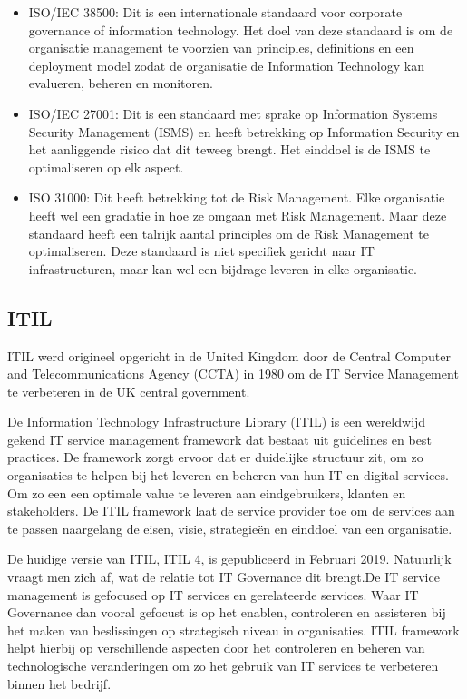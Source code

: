 \begin{itemize}
    \item ISO/IEC 38500:
    Dit is een internationale standaard voor corporate governance of information technology. Het doel van deze standaard is om de organisatie management te voorzien van principles, definitions en een deployment model zodat de organisatie de Information Technology kan evalueren, beheren en monitoren. \autocite{Mikkola2021}
    \item ISO/IEC 27001:
    Dit is een standaard met sprake op Information Systems Security Management (ISMS) en heeft betrekking op Information Security en het aanliggende risico dat dit teweeg brengt. Het einddoel is de ISMS te optimaliseren op elk aspect. \autocite{AlMayahi2012}
    \item ISO 31000:
    Dit heeft betrekking tot de Risk Management. Elke organisatie heeft wel een gradatie in hoe ze omgaan met Risk Management. Maar deze standaard heeft een talrijk aantal principles om de Risk Management te optimaliseren. \autocite{Florea2016}
    Deze standaard is niet specifiek gericht naar IT infrastructuren, maar kan wel een bijdrage leveren in elke organisatie. 
\end{itemize}


\subsection{ITIL}

ITIL werd origineel opgericht in de United Kingdom door de Central Computer and Telecommunications Agency (CCTA) in 1980 om de IT Service Management te verbeteren in de UK central government. \autocite{Potgieter2005}


De Information Technology Infrastructure Library (ITIL) is een wereldwijd gekend IT service management framework dat bestaat uit guidelines en best practices.  \autocite{Potgieter2005}
De framework zorgt ervoor dat er duidelijke structuur zit, om zo organisaties te helpen bij het leveren en beheren van hun IT en digital services. Om zo een een optimale value te leveren aan eindgebruikers, klanten en stakeholders. 
De ITIL framework laat de service provider toe om de services aan te passen naargelang de eisen, visie, strategieën en einddoel van een organisatie. \autocite{Mikkola2021}

De huidige versie van ITIL, ITIL 4, is gepubliceerd in Februari 2019. \autocite{Mikkola2021}
Natuurlijk vraagt men zich af, wat de relatie tot IT Governance dit brengt.De IT service management is gefocused op IT services en gerelateerde services.
Waar IT Governance dan vooral gefocust is op het enablen, controleren en assisteren bij het maken van beslissingen op strategisch niveau in organisaties. ITIL framework helpt hierbij op verschillende aspecten door het controleren en beheren van technologische veranderingen om zo het gebruik van IT services te verbeteren binnen het bedrijf. \autocite{Mikkola2021}


